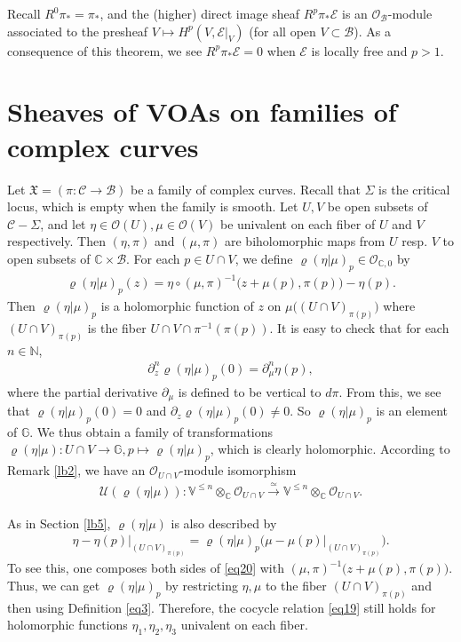 \documentclass[12pt,a4paper,notitlepage]{article}
\theoremstyle{definition}
\theoremstyle{plain}
\newcommand{\fk}{\mathfrak}
\newcommand{\mc}{\mathcal}
\newcommand{\scr}{\mathscr}
\newcommand{\Vbb}{\mathbb V}
\newcommand{\Gbb}{\mathbb G}
\newcommand{\Cbb}{\mathbb C}
\newcommand{\Nbb}{\mathbb N}
\numberwithin{equation}{section}
\begin{document}
Recall  $R^0\pi_*=\pi_*$, and the (higher) direct image sheaf $R^p\pi_*\scr E$ is an $\scr O_{\mc B}$-module associated to the presheaf $V\mapsto H^p(V,\scr E|_V)$ (for all open $V\subset\mc B$). As a consequence of this theorem, we see $R^p\pi_*\scr E=0$ when $\scr E$ is locally free and $p>1$.



\section{Sheaves of VOAs on families of complex curves}\label{lb23}



Let $\fk X=(\pi:\mc C\rightarrow\mc B)$ be a family of complex curves. Recall that $\Sigma$ is the critical locus, which is empty when the family is smooth. Let $U,V$ be open subsets of $\mc C-\Sigma$, and let $\eta\in\scr O(U),\mu\in\scr O(V)$ be univalent on each fiber of $U$ and $V$ respectively. Then  $(\eta,\pi)$ and $(\mu,\pi)$ are biholomorphic maps from $U$ resp. $V$ to open subsets of $\Cbb\times\mc B$.   For each $p\in U\cap V$, we define $\varrho(\eta|\mu)_p\in\scr O_{\Cbb,0}$ by
\begin{align}
\varrho(\eta|\mu)_p(z)=\eta\circ(\mu,\pi)^{-1}\big(z+\mu(p),\pi(p)\big)-\eta(p).
\end{align}
Then $\varrho(\eta|\mu)_p$ is a holomorphic function of $z$ on  $\mu\big((U\cap V)_{\pi(p)}\big)$ where $(U\cap V)_{\pi(p)}$ is the fiber $U\cap V\cap \pi^{-1}(\pi(p))$. It is easy to check that for each $n\in\Nbb$,
\begin{align}
\partial_z^n\varrho(\eta|\mu)_p(0)=\partial_\mu^n \eta(p),
\end{align}
where the partial derivative $\partial_\mu$ is defined to be vertical to $d\pi$. From this, we see that $\varrho(\eta|\mu)_p(0)=0$ and  $\partial_z\varrho(\eta|\mu)_p(0)\neq0$. So $\varrho(\eta|\mu)_p$ is an element of $\Gbb$. We thus obtain a family of transformations $\varrho(\eta|\mu):U\cap V\rightarrow\Gbb,p\mapsto \varrho(\eta|\mu)_p$, which  is clearly holomorphic. According to Remark \ref{lb2},  we have an $\scr O_{U\cap V}$-module isomorphism
\begin{align*}
\mc U(\varrho(\eta|\mu)):\Vbb^{\leq n}\otimes_\Cbb\scr O_{U\cap V}\xrightarrow{\simeq} \Vbb^{\leq n}\otimes_\Cbb\scr O_{U\cap V}.
\end{align*}

As in Section \ref{lb5}, $\varrho(\eta|\mu)$ is also described by
\begin{align}
\eta-\eta(p)\big|_{(U\cap V)_{\pi(p)}}=\varrho(\eta|\mu)_p\big(\mu-\mu(p)\big|_{(U\cap V)_{\pi(p)}}\big).\label{eq20}
\end{align}
To see this, one composes both sides of \eqref{eq20} with $(\mu,\pi)^{-1}\big(z+\mu(p),\pi(p)\big)$.  Thus, we can get $\varrho(\eta|\mu)_p$ by restricting $\eta,\mu$ to the fiber $(U\cap V)_{\pi(p)}$ and then using Definition \eqref{eq3}. Therefore, the cocycle relation \eqref{eq19} still holds for holomorphic functions $\eta_1,\eta_2,\eta_3$ univalent on each fiber.
\end{document}
